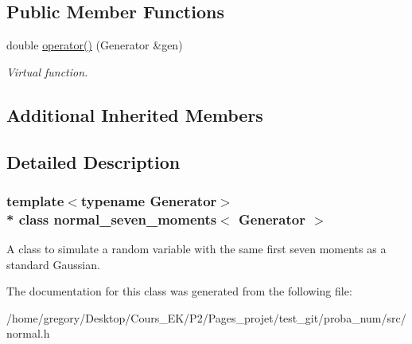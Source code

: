 \subsection*{Public Member Functions}
\begin{DoxyCompactItemize}
\item 
double \hyperlink{classnormal__seven__moments_a45d2d30b82cd449a4e3e2d9fe266b786}{operator()} (Generator \&gen)\hypertarget{classnormal__seven__moments_a45d2d30b82cd449a4e3e2d9fe266b786}{}\label{classnormal__seven__moments_a45d2d30b82cd449a4e3e2d9fe266b786}

\begin{DoxyCompactList}\small\item\em Virtual function. \end{DoxyCompactList}\end{DoxyCompactItemize}
\subsection*{Additional Inherited Members}


\subsection{Detailed Description}
\subsubsection*{template$<$typename Generator$>$\\*
class normal\+\_\+seven\+\_\+moments$<$ Generator $>$}

A class to simulate a random variable with the same first seven moments as a standard Gaussian. 

The documentation for this class was generated from the following file\+:\begin{DoxyCompactItemize}
\item 
/home/gregory/\+Desktop/\+Cours\+\_\+\+E\+K/\+P2/\+Pages\+\_\+projet/test\+\_\+git/proba\+\_\+num/src/normal.\+h\end{DoxyCompactItemize}
